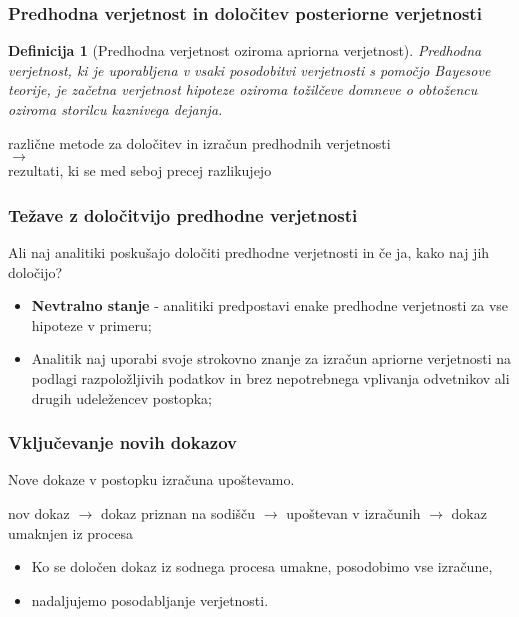 \documentclass{beamer}
\newtheorem{definicija}{Definicija}
\begin{document}
\begin{frame}
   \frametitle{Predhodna verjetnost in določitev posteriorne verjetnosti}
   \begin{definicija}[Predhodna verjetnost oziroma apriorna verjetnost]
      Predhodna verjetnost, ki je uporabljena v vsaki posodobitvi verjetnosti s pomočjo Bayesove teorije, je začetna verjetnost hipoteze 
      oziroma tožilčeve domneve o obtožencu oziroma storilcu kaznivega dejanja.
  \end{definicija} \vspace{3mm}
  \begin{block}{}
   \centering
   različne metode za določitev in izračun predhodnih verjetnosti\\ \vspace{2mm}
   $\rightarrow$ \\ \vspace{3mm}
   rezultati, ki se med seboj precej razlikujejo
   \end{block}
\end{frame}

\begin{frame}
   \frametitle{Težave z določitvijo predhodne verjetnosti}
   \begin{block}{Ali naj analitiki poskušajo določiti predhodne verjetnosti in če ja, kako naj jih določijo?}
       \begin{itemize}
           \item \textbf{Nevtralno stanje} - analitiki predpostavi enake predhodne verjetnosti za vse hipoteze v primeru;
           \item Analitik naj uporabi svoje strokovno znanje za izračun apriorne verjetnosti na podlagi razpoložljivih podatkov in brez nepotrebnega vplivanja odvetnikov ali drugih udeležencev postopka;
       \end{itemize}
   \end{block}
\end{frame}

\begin{frame}
   \frametitle{Vključevanje novih dokazov}
   Nove dokaze v postopku izračuna upoštevamo. \vspace{3mm}
   \begin{block}{}
      \centering
      nov dokaz $\rightarrow$  dokaz priznan na sodišču $\rightarrow$ upoštevan v izračunih $\rightarrow$ dokaz umaknjen iz procesa
      \vspace{3mm}
   \end{block}
   \begin{itemize}
      \item Ko se določen dokaz iz sodnega procesa umakne, posodobimo vse izračune,
      \item nadaljujemo posodabljanje verjetnosti.
   \end{itemize}
\end{frame}
\end{document}
